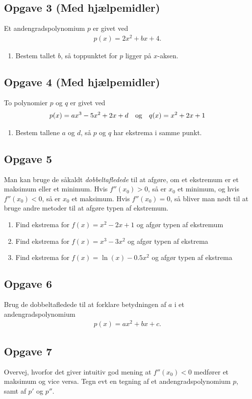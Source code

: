 \subsection*{Opgave 3 (Med hjælpemidler)}
Et andengradspolynomium $p$ er givet ved
\begin{align}
		p(x) = 2x^2 + bx + 4.
\end{align}
\begin{enumerate}[label=\roman*)]
	\item Bestem tallet $b$, så toppunktet for $p$ ligger på $x$-aksen.
\end{enumerate}

\subsection*{Opgave 4 (Med hjælpemidler)}
To polynomier $p$ og $q$ er givet ved 
\begin{align*}
	p(x) = ax^3 - 5x^2 + 2x + d \quad \textnormal{og} \quad q(x) = x^2 + 2x + 1
\end{align*}
\begin{enumerate}[label=\roman*)]
	\item Bestem tallene $a$ og $d$, så $p$ og $q$ har ekstrema i samme punkt. 
\end{enumerate}

\subsection*{Opgave 5}
Man kan bruge de såkaldt \textit{dobbeltafledede} til at afgøre, om et ekstremum er et maksimum eller et minimum. Hvis $f''(x_0) > 0$, så er $x_0$ et minimum, og hvis $f''(x_0) < 0$, så er $x_0$ et maksimum. Hvis $f''(x_0) = 0$, så bliver man nødt til at bruge andre metoder til at afgøre typen af ekstremum. 

\begin{enumerate}[label = \roman*)]
	\item Find ekstrema for $f(x) = x^2 -2x + 1$ og afgør typen af ekstremum
	\item Find ekstrema for $f(x) = x^3 - 3x^2$ og afgør typen af ekstrema
	\item Find ekstrema for $f(x) = \ln(x) - 0.5x^2$ og afgør typen af ekstrema
\end{enumerate}

\subsection*{Opgave 6}
Brug de dobbeltafledede til at forklare betydningen af $a$ i et andengradspolynomium 
\begin{align*}
	p(x) = ax^2 + bx + c.
\end{align*}

\subsection*{Opgave 7}
Overvej, hvorfor det giver intuitiv god mening at $f''(x_0) < 0$ medfører et maksimum og vice versa. Tegn evt en tegning af et andengradspolynomium $p$, samt af $p'$ og $p''$.
